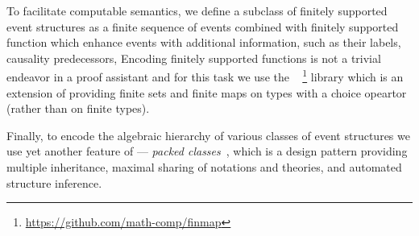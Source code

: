 To facilitate computable semantics, we define a subclass of
finitely supported event structures as a finite sequence of events
combined with finitely supported function which enhance events with 
additional information, such as their labels, causality predecessors, \etc 
Encoding finitely supported functions is not a trivial endeavor in
a proof assistant and for this task we use the \finmap~%
\footnote{\url{https://github.com/math-comp/finmap}}
library which is an extension of \mathcomp providing finite sets and
finite maps on types with a choice opeartor (rather than on finite types).

Finally, to encode the algebraic hierarchy of various classes of event structures
we use yet another feature of \mathcomp --- 
\emph{packed classes}~\cite{Garillot-al:ICTPHOL2009},
which is a design pattern providing multiple inheritance,
maximal sharing of notations and theories,
and automated structure inference. %


